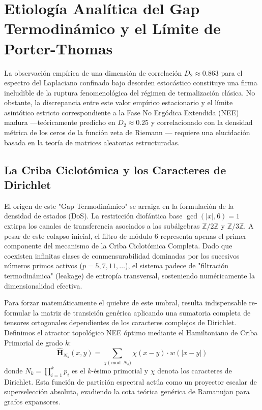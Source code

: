\documentclass[sn-mathphys]{sn-jnl}
\newcommand{\Z}{\mathbb{Z}}
\begin{document}
\section{Etiología Analítica del Gap Termodinámico y el Límite de Porter-Thomas}

La observación empírica de una dimensión de correlación $D_2 \approx 0.863$ para el espectro del Laplaciano confinado bajo desorden estocástico constituye una firma ineludible de la ruptura fenomenológica del régimen de termalización clásica. No obstante, la discrepancia entre este valor empírico estacionario y el límite asintótico estricto correspondiente a la Fase No Ergódica Extendida (NEE) madura —teóricamente predicho en $D_2 \approx 0.25$ y correlacionado con la densidad métrica de los ceros de la función zeta de Riemann \cite{Peinador2026}— requiere una elucidación basada en la teoría de matrices aleatorias estructuradas.

\subsection{La Criba Ciclotómica y los Caracteres de Dirichlet}
El origen de este "Gap Termodinámico" se arraiga en la formulación de la densidad de estados (DoS). La restricción diofántica base $\gcd(|x|, 6) = 1$ extirpa los canales de transferencia asociados a las subálgebras $\Z/2\Z$ y $\Z/3\Z$. A pesar de este colapso inicial, el filtro de módulo 6 representa apenas el primer componente del mecanismo de la Criba Ciclotómica Completa. Dado que coexisten infinitas clases de conmensurabilidad dominadas por los sucesivos números primos activos ($p = 5, 7, 11, \dots$), el sistema padece de "filtración termodinámica" (leakage) de entropía transversal, sosteniendo numéricamente la dimensionalidad efectiva.

Para forzar matemáticamente el quiebre de este umbral, resulta indispensable re-formular la matriz de transición genérica aplicando una sumatoria completa de tensores ortogonales dependientes de los caracteres complejos de Dirichlet. Definimos el atractor topológico NEE óptimo mediante el Hamiltoniano de Criba Primorial de grado $k$:
\begin{equation}
\mathbf{\hat{H}}_{N_k}(x, y) = \sum_{\chi \pmod{N_k}} \chi(x - y) \cdot w(|x-y|)
\end{equation}
donde $N_k = \prod_{i=1}^k p_i$ es el $k$-ésimo primorial y $\chi$ denota los caracteres de Dirichlet. Esta función de partición espectral actúa como un proyector escalar de superselección absoluta, evadiendo la cota teórica genérica de Ramanujan para grafos expansores.
\end{document}
